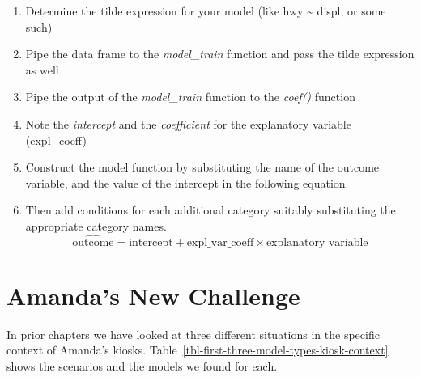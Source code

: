 \documentclass[
  12pt,
  letterpaper,
  DIV=11,
  numbers=noendperiod]{scrreprt}
\providecommand{\tightlist}{%
  \setlength{\itemsep}{0pt}\setlength{\parskip}{0pt}}
\begin{document}
\begin{tcolorbox}[enhanced jigsaw, colback=white, leftrule=.75mm, toprule=.15mm, bottomtitle=1mm, breakable, coltitle=black, toptitle=1mm, title=\textcolor{quarto-callout-tip-color}{\faLightbulb}\hspace{0.5em}{Steps to build the model function for models with one numerical
explanatory variable}, opacitybacktitle=0.6, colbacktitle=quarto-callout-tip-color!10!white, arc=.35mm, left=2mm, colframe=quarto-callout-tip-color-frame, titlerule=0mm, rightrule=.15mm, bottomrule=.15mm, opacityback=0]

\begin{enumerate}
\def\labelenumi{\arabic{enumi}.}
\tightlist
\item
  Determine the tilde expression for your model (like hwy
  \textasciitilde{} displ, or some such)
\item
  Pipe the data frame to the \emph{model\_train} function and pass the
  tilde expression as well
\item
  Pipe the output of the \emph{model\_train} function to the
  \emph{coef()} function
\item
  Note the \emph{intercept} and the \emph{coefficient} for the
  explanatory variable (expl\_coeff)
\item
  Construct the model function by substituting the name of the outcome
  variable, and the value of the intercept in the following equation.
\item
  Then add conditions for each additional category suitably substituting
  the appropriate category names. \[
  \widehat{\text{outcome}} = \text{intercept} + \text{expl\_var\_coeff}\times\text{explanatory variable}
  \]
\end{enumerate}

\end{tcolorbox}

\chapter{Amanda's New Challenge}\label{sec-num-cat-explanatories}

In prior chapters we have looked at three different situations in the
specific context of Amanda's kiosks.
Table~\ref{tbl-first-three-model-types-kiosk-context} shows the
scenarios and the models we found for each.
\end{document}

